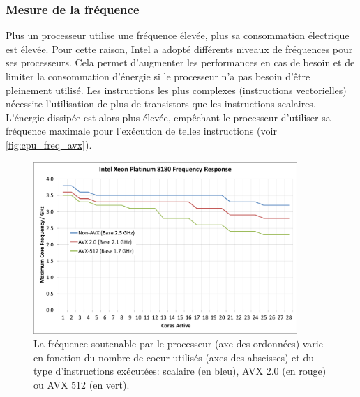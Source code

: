     \subsubsection{Mesure de la fréquence}
        Plus un processeur utilise une fréquence élevée, plus sa consommation électrique est élevée. Pour cette raison, Intel a adopté différents niveaux de fréquences pour ses processeurs. Cela permet d'augmenter les performances en cas de besoin et de limiter la consommation d'énergie si le processeur n'a pas besoin d'être pleinement utilisé. Les instructions les plus complexes (instructions vectorielles) nécessite l'utilisation de plus de transistors que les instructions scalaires. L'énergie dissipée est alors plus élevée, empêchant le processeur d'utiliser sa fréquence maximale pour l'exécution de telles instructions (voir \autoref{fig:cpu_freq_avx}). 
        
        \begin{figure}
            \center
            \includegraphics[width=10cm]{images/cpu_freq_avx.png}
            \caption{\label{fig:cpu_freq_avx} La fréquence soutenable par le processeur (axe des ordonnées) varie en fonction du nombre de coeur utilisés (axes des abscisses) et du type d'instructions exécutées: scalaire (en bleu), AVX 2.0 (en rouge) ou AVX 512 (en vert)\protect\footnotemark.}
        \end{figure}
        
